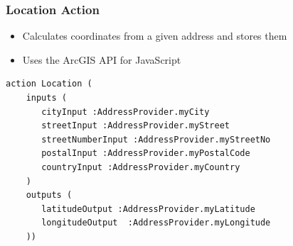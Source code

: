 \begin{frame}
\begin{center}
	\end{center}
\end{frame}


\begin{frame}[fragile]
\frametitle{Location Action}

\begin{itemize}
\item Calculates coordinates from a given address and stores them
\item Uses the ArcGIS API for JavaScript
\end{itemize}

\begin{lstlisting}[basicstyle=\footnotesize\ttfamily]
action Location (
    inputs (
       cityInput :AddressProvider.myCity
       streetInput :AddressProvider.myStreet
       streetNumberInput :AddressProvider.myStreetNo
       postalInput :AddressProvider.myPostalCode
       countryInput :AddressProvider.myCountry
    )
    outputs (
       latitudeOutput :AddressProvider.myLatitude
       longitudeOutput  :AddressProvider.myLongitude
    ))		 				
\end{lstlisting}

\end{frame}


